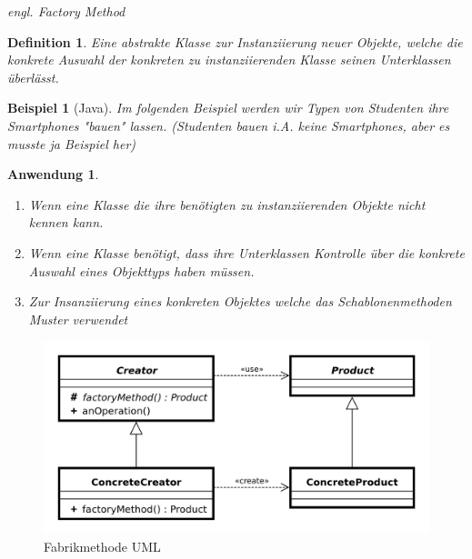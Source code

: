 \documentclass[a4paper]{article}
\theoremstyle{break}
\newtheorem{defi}{Definition}[section]
\newtheorem{ex}{Beispiel}[section]
\newtheorem{why}{Anwendung}[section]
\begin{document}
\textit{engl. Factory Method}

\begin{defi}
	Eine abstrakte Klasse zur Instanziierung neuer Objekte, welche die konkrete Auswahl der konkreten zu instanziierenden Klasse seinen Unterklassen überlässt.
\end{defi}

\begin{ex}[Java]
	Im folgenden Beispiel werden wir Typen von Studenten ihre Smartphones "bauen" lassen. (Studenten bauen i.A. keine Smartphones, aber es musste ja Beispiel her)

	
	
	
	
	
	
	
\end{ex}

\begin{why}
	\begin{enumerate}
		\item 	Wenn eine Klasse die ihre benötigten zu instanziierenden Objekte nicht kennen kann.
		\item Wenn eine Klasse benötigt, dass ihre Unterklassen Kontrolle über die konkrete Auswahl eines Objekttyps haben müssen.
		\item Zur Insanziierung eines konkreten Objektes welche das Schablonenmethoden Muster verwendet
	\end{enumerate}
\end{why}
\begin{figure}[H]
	\centering
	\includegraphics[width=\textwidth]{../uml/FactoryMethodPattern.png}
	\caption{Fabrikmethode UML}
	\label{fig3}
\end{figure}
\end{document}
